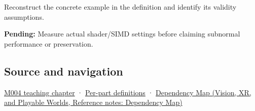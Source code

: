 Reconstruct the concrete example in the definition and identify its validity assumptions.

\textbf{Pending:} Measure actual shader/SIMD settings before claiming subnormal performance or preservation.

\subsection{Source and navigation}\label{appendix-e979eb012782-source-and-navigation}

\hyperref[01-foundations-i-ch001-a-stretching-ruler-for-real-valued-quantities]{M004 teaching chapter} · \hyperref[appendix-fd090d982a15-m004---parts-61-76]{Per-part definitions} · \href{../07-Vision-XR-and-Playable-Worlds/main.pdf\#nameddest=appendix-4ad47bdd269a}{Dependency Map (Vision, XR, and Playable Worlds, Reference notes: Dependency Map)}
